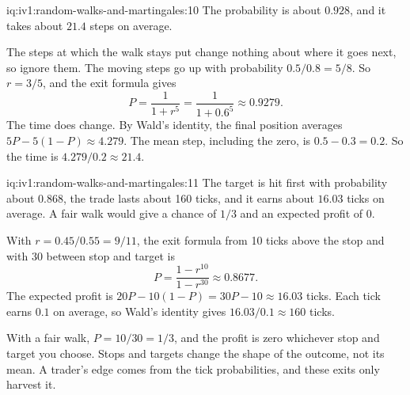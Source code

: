 \enlargethispage{-4\baselineskip}%
\begin{solution}{iq:iv1:random-walks-and-martingales:10}
The probability is about $0.928$, and it takes about $21.4$ steps on average.

The steps at which the walk stays put change nothing about where it goes next, so ignore them. The moving steps go up with probability $0.5/0.8 = 5/8$. So $r = 3/5$, and the exit formula gives
\[
P = \frac{1}{1 + r^5} = \frac{1}{1 + 0.6^5} \approx 0.9279.
\]
The time does change. By Wald's identity, the final position averages $5P - 5(1 - P) \approx 4.279$. The mean step, including the zero, is $0.5 - 0.3 = 0.2$. So the time is $4.279/0.2 \approx 21.4$.

\end{solution}

\begin{solution}{iq:iv1:random-walks-and-martingales:11}
The target is hit first with probability about $0.868$, the trade lasts about 160 ticks, and it earns about $16.03$ ticks on average. A fair walk would give a chance of $1/3$ and an expected profit of 0.

With $r = 0.45/0.55 = 9/11$, the exit formula from 10 ticks above the stop and with 30 between stop and target is
\[
P = \frac{1 - r^{10}}{1 - r^{30}} \approx 0.8677.
\]
The expected profit is $20P - 10(1 - P) = 30P - 10 \approx 16.03$ ticks. Each tick earns $0.1$ on average, so Wald's identity gives $16.03/0.1 \approx 160$ ticks.

With a fair walk, $P = 10/30 = 1/3$, and the profit is zero whichever stop and target you choose. Stops and targets change the shape of the outcome, not its mean. A trader's edge comes from the tick probabilities, and these exits only harvest it.

\end{solution}


